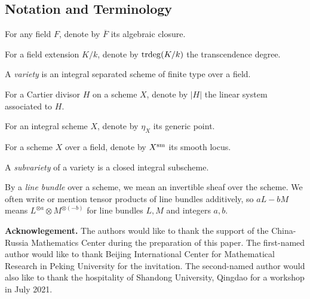 \documentclass[12pt]{amsart}
\begin{document}
\subsection{Notation and Terminology}
\begin{points}
\item[$\bullet$] For any field $F$, denote by $\overline F$ its algebraic closure.
\item[$\bullet$] For a field extension $K/k$, denote by ${\mathrm{trdeg}}(K/k)$ the transcendence degree.
\item[$\bullet$] A \emph{variety} is an integral separated scheme of finite type over a field.
\item[$\bullet$] For a Cartier divisor $H$ on a scheme $X$, denote by $|H|$ the linear system associated to $H.$
\item[$\bullet$] For an integral scheme $X$, denote by $\eta_X$ its generic point.
\item[$\bullet$] For a scheme $X$ over a field, denote by $X^{{\rm sm}}$ its smooth locus.
\item[$\bullet$] A \emph{subvariety} of a variety is a closed integral subscheme.
\item[$\bullet$]
By a \emph{line bundle} over a scheme, we mean an invertible sheaf over the scheme. 
We often write or mention tensor products of line bundles additively, so $aL-bM$ means
$L^{\otimes a}\otimes M^{\otimes (-b)}$
for line bundles $L,M$ and integers $a,b$.
\end{points}


\medskip


\noindent\textbf{Acknowlegement.}
The authors would like to thank the support of the China-Russia Mathematics Center during the preparation of this paper.
The first-named author would like to thank Beijing International Center for Mathematical Research in Peking University 
for the invitation. The second-named author would also like to thank the hospitality of Shandong University, Qingdao for a workshop in July 2021. 
\end{document}
